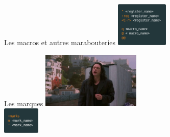 \documentclass[10pt]{beamer}
\begin{document}
	\begin{frame}{Les macros et autres marabouteries}
		\center
		\includegraphics[height=80]{img/macro-and-regs.png}
	\end{frame}

	\begin{frame}{Les marques}
		\center
		\includegraphics[height=100]{img/mark.jpeg}\\
		\vspace{16pt}
		\includegraphics[height=48]{img/markers.png}
	\end{frame}
\end{document}
